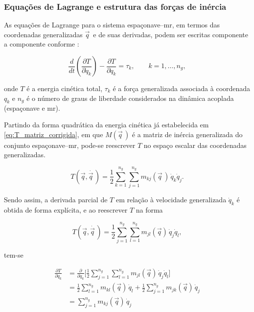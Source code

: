 \subsubsection{Equações de Lagrange e estrutura das forças de inércia}
\label{sec:dinAcoplada_equacoes_Lagrange}

As equações de Lagrange para o sistema espaçonave--\gls{mr}, em termos das coordenadas generalizadas $\vec q\,$ e de suas derivadas, podem ser escritas componente a componente conforme \cite{Wilde2018}:

\begin{equation}
\frac{d}{dt}\!\left(\frac{\partial T}{\partial \dot q_k}\right)
-\frac{\partial T}{\partial q_k}
=
\tau_k,
\qquad
k = 1,\dots,n_g,
\label{eq:lagrange_componentes}
\end{equation}

onde $T$ é a energia cinética total, $\tau_k$ é a força generalizada associada à coordenada $q_k$ e $n_g$ é o número de graus de liberdade considerados na dinâmica acoplada (espaçonave e \gls{mr}).

Partindo da forma quadrática da energia cinética já estabelecida em
\eqref{eq:T_matriz_corrigida}, em que $M(\vec q\,)$ é a matriz de inércia
generalizada do conjunto espaçonave--\gls{mr}, pode-se reescrever $T$ no
espaço escalar das coordenadas generalizadas.

\begin{equation}
T(\vec q,\dot{\vec q\, })
=
\frac{1}{2}
\sum_{k=1}^{n_g}\sum_{j=1}^{n_g}
m_{kj}(\vec q\, )\,\dot q_k \dot q_j.
\label{eq:T_expandida_mkj}
\end{equation}

Sendo assim, a derivada parcial de $T$ em relação à velocidade generalizada
$\dot q_k$ é obtida de forma explícita, e ao reescrever $T$ na forma

\begin{equation}
T(\vec q,\dot{\vec q\, })
=
\frac{1}{2}
\sum_{j=1}^{n_g}\sum_{l=1}^{n_g}
m_{jl}(\vec q)\,\dot q_j \dot q_l,
\end{equation}

tem-se

\begin{equation}
\begin{aligned}
\frac{\partial T}{\partial \dot q_k}
&=
\frac{\partial}{\partial \dot q_k}
\biggl[
\frac{1}{2}
\sum_{j=1}^{n_g}\sum_{l=1}^{n_g}
m_{jl}(\vec q)\,\dot q_j \dot q_l
\biggr]
\\
&=
\frac{1}{2}
\sum_{l=1}^{n_g}
m_{kl}(\vec q)\,\dot q_l
+
\frac{1}{2}
\sum_{j=1}^{n_g}
m_{jk}(\vec q)\,\dot q_j
\\
&=
\sum_{j=1}^{n_g}
m_{kj}(\vec q)\,\dot q_j
\end{aligned}
\label{eq:dT_dqdot_intermediaria}
\end{equation}

